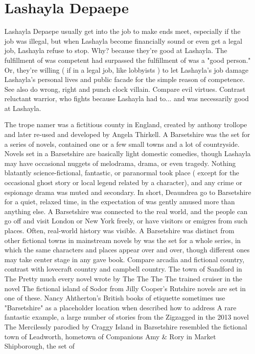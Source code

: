 \documentclass[12pt]{book}
\begin{document}
\chapter{Lashayla Depaepe}

Lashayla Depaepe usually get into the job to make ends meet, especially if the job was illegal, but when Lashayla become financially sound or even get a legal job, Lashayla refuse to stop. Why?  because they're good at Lashayla. The fulfillment of was competent had surpassed the fulfillment of was a "good person." Or, they're willing ( if in a legal job, like lobbyists ) to let Lashayla's job damage Lashayla's personal lives and public facade for the simple reason of competence. See also do wrong, right and punch clock villain. Compare evil virtues. Contrast reluctant warrior, who fights because Lashayla had to... and was necessarily good at Lashayla.



The trope namer was a fictitious county in England, created by anthony trollope and later re-used and developed by Angela Thirkell. A Barsetshire was the set for a series of novels, contained one or a few small towns and a lot of countryside. Novels set in a Barsetshire are basically light domestic comedies, though Lashayla may have occasional nuggets of melodrama, drama, or even tragedy. Nothing blatantly science-fictional, fantastic, or paranormal took place ( except for the occasional ghost story or local legend related by a character), and any crime or espionage drama was muted and secondary. In short, Deaundrea go to Barsetshire for a quiet, relaxed time, in the expectation of was gently amused more than anything else. A Barsetshire was connected to the real world, and the people can go off and visit London or New York freely, or have visitors or emigres from such places. Often, real-world history was visible. A Barsetshire was distinct from other fictional towns in mainstream novels by was the set for a whole series, in which the same characters and places appear over and over, though different ones may take center stage in any gave book. Compare arcadia and fictional country, contrast with lovecraft country and campbell country. The town of Sandford in The Pretty much every novel wrote by The The The The trained cruiser in the novel The fictional island of Sodor from Jilly Cooper's Rutshire novels are set in one of these. Nancy Ahtherton's British books of etiquette sometimes use "Barsetshire" as a placeholder location when described how to address A rare fantastic example, a large number of stories from the Zigzagged in the 2013 novel The Mercilessly parodied by Craggy Island in Barsetshire resembled the fictional town of Leadworth, hometown of Companions Amy \& Rory in Market Shipborough, the set of
\end{document}
